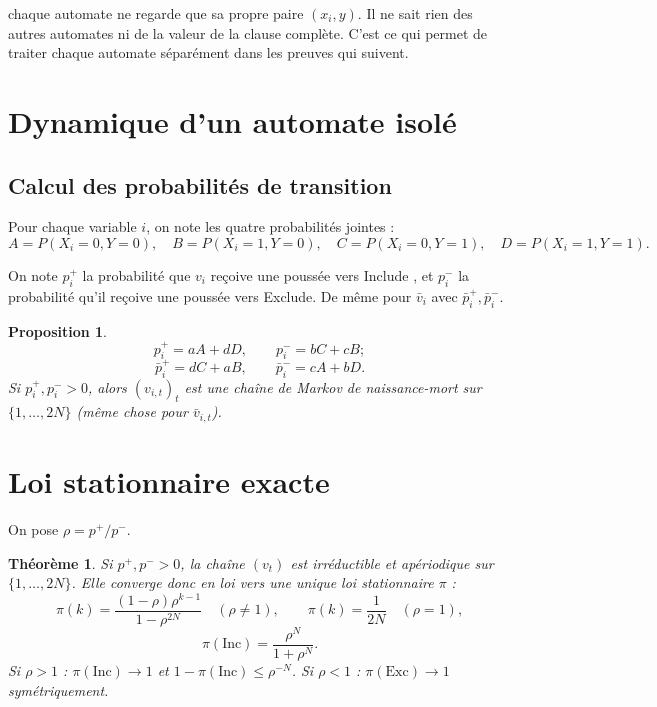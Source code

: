 \documentclass[11pt]{article}
\newtheorem{theorem}{Théorème}
\newtheorem{proposition}{Proposition}
\begin{document}
chaque automate ne regarde que sa propre paire $(x_i, y)$. Il ne sait rien des autres automates ni de la valeur de la clause complète. C'est ce qui permet de traiter chaque automate séparément dans les preuves qui suivent.

\section{Dynamique d'un automate isolé}

\subsection{Calcul des probabilités de transition}

Pour chaque variable $i$, on note les quatre probabilités jointes :
$$A = P(X_i=0, Y=0), \quad B = P(X_i=1, Y=0), \quad C = P(X_i=0, Y=1), \quad D = P(X_i=1, Y=1).$$

On note $p_i^+$ la probabilité que $v_i$ reçoive une poussée vers Include , et $p_i^-$ la probabilité qu'il reçoive une poussée vers Exclude. De même pour $\bar v_i$ avec $\bar p_i^+, \bar p_i^-$.

\begin{proposition}\label{prop:pv}
$$p_i^+ = aA + dD, \qquad p_i^- = bC + cB;$$
$$\bar p_i^+ = dC + aB, \qquad \bar p_i^- = cA + bD.$$
Si $p_i^+, p_i^- > 0$, alors $(v_{i,t})_t$ est une chaîne de Markov de naissance-mort sur $\{1, \dots, 2N\}$ (même chose pour $\bar v_{i,t}$).
\end{proposition}




\section{Loi stationnaire exacte}

On pose $\rho = p^+ / p^-$.

\begin{theorem}\label{thm:stat}
Si $p^+, p^- > 0$, la chaîne $(v_t)$ est irréductible et apériodique sur $\{1, \dots, 2N\}$. Elle converge donc en loi vers une unique loi stationnaire $\pi$ :
$$\pi(k) = \frac{(1-\rho)\rho^{k-1}}{1 - \rho^{2N}} \quad (\rho \ne 1), \qquad \pi(k) = \frac{1}{2N} \quad (\rho = 1),$$
$$\pi(\text{Inc}) = \frac{\rho^N}{1 + \rho^N}.$$
Si $\rho > 1$ : $\pi(\text{Inc}) \to 1$ et $1 - \pi(\text{Inc}) \le \rho^{-N}$. Si $\rho < 1$ : $\pi(\text{Exc}) \to 1$ symétriquement.

\end{theorem}
\end{document}
